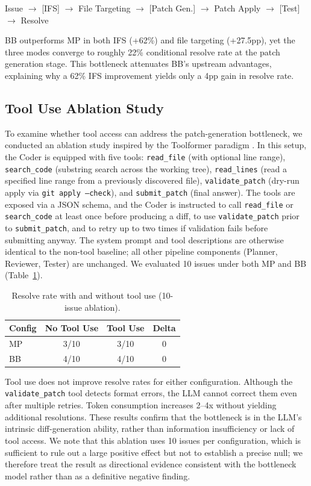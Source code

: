 \documentclass{ieeeaccess}
\begin{document}
Issue $\rightarrow$ [IFS] $\rightarrow$ File Targeting $\rightarrow$ [Patch Gen.] $\rightarrow$ Patch Apply $\rightarrow$ [Test] $\rightarrow$ Resolve

BB outperforms MP in both IFS (+62\%) and file targeting (+27.5pp), yet the three modes converge to roughly 22\% conditional resolve rate at the patch generation stage. This bottleneck attenuates BB's upstream advantages, explaining why a 62\% IFS improvement yields only a 4pp gain in resolve rate.

\subsection{Tool Use Ablation Study}
\label{sec:tool-ablation-study}

To examine whether tool access can address the patch-generation bottleneck, we conducted an ablation study inspired by the Toolformer paradigm \cite{schick2023toolformer}. In this setup, the Coder is equipped with five tools: \texttt{read\_file} (with optional line range), \texttt{search\_code} (substring search across the working tree), \texttt{read\_lines} (read a specified line range from a previously discovered file), \texttt{validate\_patch} (dry-run apply via \texttt{git apply --check}), and \texttt{submit\_patch} (final answer). The tools are exposed via a JSON schema, and the Coder is instructed to call \texttt{read\_file} or \texttt{search\_code} at least once before producing a diff, to use \texttt{validate\_patch} prior to \texttt{submit\_patch}, and to retry up to two times if validation fails before submitting anyway. The system prompt and tool descriptions are otherwise identical to the non-tool baseline; all other pipeline components (Planner, Reviewer, Tester) are unchanged. We evaluated 10 issues under both MP and BB (Table~\ref{tab:tool-ablation}).

\begin{table}[!ht]
\centering
\caption{Resolve rate with and without tool use (10-issue ablation).}
\label{tab:tool-ablation}
\begin{tabular}{lccc}
\toprule
\textbf{Config} & \textbf{No Tool Use} & \textbf{Tool Use} & \textbf{Delta} \\
\midrule
MP & 3/10 & 3/10 & 0 \\
BB & 4/10 & 4/10 & 0 \\
\bottomrule
\end{tabular}
\end{table}

Tool use does not improve resolve rates for either configuration. Although the \texttt{validate\_patch} tool detects format errors, the LLM cannot correct them even after multiple retries. Token consumption increases 2--4x without yielding additional resolutions. These results confirm that the bottleneck is in the LLM's intrinsic diff-generation ability, rather than information insufficiency or lack of tool access. We note that this ablation uses 10 issues per configuration, which is sufficient to rule out a large positive effect but not to establish a precise null; we therefore treat the result as directional evidence consistent with the bottleneck model rather than as a definitive negative finding.
\end{document}
